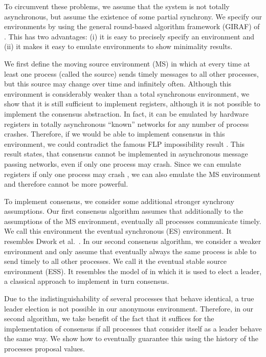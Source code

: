 \documentclass[conference, compsoc]{IEEEtran}
\begin{document}
To circumvent these problems, we assume that the system is not totally asynchronous, but assume the existence of some partial synchrony. We specify our environments by using the general round-based algorithm framework (GIRAF) of \cite{1449454}. This has two advantages: (i) it is easy to precisely specify an environment and (ii) it makes it easy to emulate environments to show minimality results. 

We first define the moving source environment (MS) in which at every time at least one process (called the source) sends timely messages to all other processes, but this source may change over time and infinitely often. Although this environment is considerably weaker than a total synchronous environment, we show that it is still sufficient to implement registers, although it is not possible to implement the consensus abstraction. In fact, it can be emulated by hardware registers in totally asynchronous ``known'' networks for any number of process crashes. Therefore, if we would be able to implement consensus in this environment, we could contradict the famous FLP impossibility result \cite{214121}. This result states, that consensus cannot be implemented in asynchronous message passing networks, even if only one process may crash. Since we can emulate registers if only one process may crash \cite{200869}, we can also emulate the MS environment and therefore cannot be more powerful.


To implement consensus, we consider some additional stronger synchrony assumptions. Our first consensus algorithm assumes that additionally to the assumptions of the MS environment, eventually all processes communicate timely. We call this environment the eventual synchronous (ES) environment. It resembles Dwork et al.~\cite{Dwork88consensusin}. In our second consensus algorithm, we consider a weaker environment and only assume that eventually always the same process is able to send timely to all other processes. We call it the eventual stable source environment (ESS). It resembles the model of \cite{872081} in which it is used to elect a leader, a classical approach to implement in turn consensus.

Due to the indistinguishability of several processes that behave identical, a true leader election is not possible in our anonymous environment. Therefore, in our second algorithm, we take benefit of the fact that it suffices for the implementation of consensus if all processes that consider itself as a leader behave the same way. We show how to eventually guarantee this using the history of the processes proposal values.  
\end{document}
